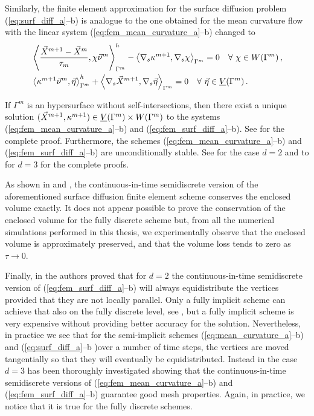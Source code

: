 Similarly, the finite element approximation for the surface diffusion problem
(\ref{eq:surf_diff_a}--b) is analogue to the one obtained for the mean
curvature flow with the linear system (\ref{eq:fem_mean_curvature_a}--b)
changed to
\begin{subequations}
\begin{align}
&\left\langle \frac{\vec{X}^{m + 1} - \vec{X}^{m}}{\tau_m},
\chi\vec{\nu}^m\right\rangle_{\Gamma^m}^{h} - \left\langle\nabla_s\kappa^{m+1},
\nabla_s\chi\right\rangle_{\Gamma^m}=0\quad \forall\ \chi \in
W(\Gamma^m)\,,\label{eq:fem_surf_diff_a}\\
&\left\langle\kappa^{m+1}\vec{\nu}^m, \vec{\eta}\right\rangle_{\Gamma^m}^{h} +
\left\langle\nabla_s\vec{X}^{m + 1},
\nabla_s\vec{\eta}\right\rangle_{\Gamma^m}=0\quad \forall\ \vec\eta \in \underline{V}(\Gamma^m)\,.
\label{eq:fem_surf_diff_b}
\end{align}
\end{subequations}

If $\Gamma^m$ is an hypersurface without self-intersections, then there exist
a unique solution $(\vec{X}^{m+1}, \kappa^{m+1}) \in \underline{V}(\Gamma^m) \times W(\Gamma^m)$ to the
systems (\ref{eq:fem_mean_curvature_a}--b) and (\ref{eq:fem_surf_diff_a}--b).
See \cite[Theorem~2.1]{gflows3d} for the complete proof. Furthermore,
the schemes (\ref{eq:fem_mean_curvature_a}--b) and
(\ref{eq:fem_surf_diff_a}--b) are unconditionally stable. See
\cite[Theorem~2.3]{triplej} for the case $d = 2$ and to
\cite[Theorem~2.2]{gflows3d} for $d = 3$ for the complete proofs.

As shown in \cite[Remark~2.3]{triplej} and \cite[\S~4]{gflows3d}, the
continuous-in-time semidiscrete version of the aforementioned surface
diffusion finite element scheme conserves the enclosed volume exactly. It does
not appear possible to prove the conservation of the enclosed volume for the
fully discrete scheme but, from all the numerical simulations performed in this
thesis, we experimentally observe that the enclosed volume is approximately
preserved, and that the volume loss tends to zero as $\tau \to 0$.

Finally, in \cite[Remark~2.4]{triplej} the authors proved that for $d=2$ the
continuous-in-time semidiscrete version of (\ref{eq:fem_surf_diff_a}--b)
will always equidistribute the vertices provided that they are not locally
parallel. Only a fully implicit scheme can achieve that also on the fully
discrete level, see \cite{fdfi}, but a fully implicit scheme is very
expensive without providing better accuracy for the solution. Nevertheless, in
practice we see that for the semi-implicit schemes
(\ref{eq:mean_curvature_a}--b) and (\ref{eq:surf_diff_a}--b )over a number of
time steps, the vertices are moved tangentially so that they will eventually be
equidistributed. Instead in \cite[\S~4]{gflows3d} the case $d=3$ has been
thoroughly investigated showing that the continuous-in-time semidiscrete
versions of (\ref{eq:fem_mean_curvature_a}--b) and
(\ref{eq:fem_surf_diff_a}--b) guarantee good mesh properties. Again, in
practice, we notice that it is true for the fully discrete schemes.

